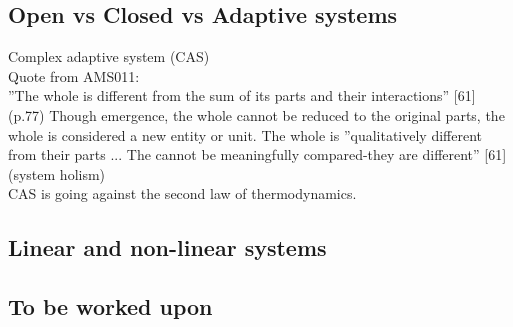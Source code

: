\subsection{Open vs Closed vs Adaptive systems}
\label{sub:tbopenclosedadaptivesystems}
Complex adaptive system (CAS)\\

Quote from AMS011: \parencite{Turner2019}\\
''The whole is different from the sum of its parts and their interactions'' [61] (p.77) Though emergence, the whole cannot be reduced to the original parts, the whole is considered a new entity or unit. The whole is ''qualitatively different from their parts ... The cannot be meaningfully compared-they are different'' [61] (system holism)\\
CAS is going against the second law of thermodynamics.\\

\textcite[p. 32]{Bertalanffy1968}

\subsection{Linear and non-linear systems}
\label{sub:linearnonlinear}



\subsection{To be worked upon}

